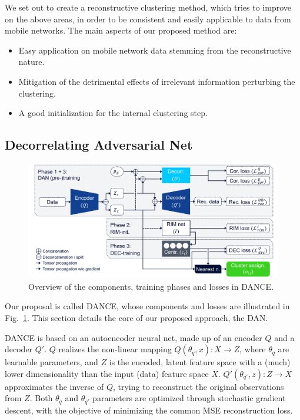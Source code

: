			We set out to create a reconstructive clustering method, which tries to improve on the above areas, in order to be consistent and easily applicable to data from mobile networks.
			The main aspects of our proposed method are:
			\begin{itemize}
				\item Easy application on mobile network data stemming from the reconstructive nature.
				\item Mitigation of the detrimental effects of irrelevant information perturbing the clustering.
				\item A good initialization for the internal clustering step.
			\end{itemize}
			
		\subsection{Decorrelating Adversarial Net}
			
			\begin{figure}[ht]
				\centering
				\includegraphics[width=\linewidth]{figures/07_decorr_ae/dance/dance.pdf}
				\caption[DANCE overview]{Overview of the components, training phases and losses in DANCE.}
				\label{fig:dan_overview}
			\end{figure}
		
			Our proposal is called \ac{DANCE}, whose components and losses are illustrated in Fig.~\ref{fig:dan_overview}.
			This section details the core of our proposed approach, the \ac{DAN}.
			
			\ac{DANCE} is based on an autoencoder neural net, made up of an encoder $Q$ and a decoder $Q'$.
			$Q$ realizes the non-linear mapping $Q(\theta_q, x) : X \rightarrow Z$, where $\theta_q$ are learnable parameters, and $Z$ is the encoded, latent feature space with a (much) lower dimensionality than the input (data) feature space $X$.
			$Q'(\theta_{q'}, z) : Z \rightarrow X$ approximates the inverse of $Q$, trying to reconstruct the original observations from $Z$.
			Both $\theta_q$ and $\theta_{q'}$ parameters are optimized through stochastic gradient descent, with the objective of minimizing the common \ac{MSE} reconstruction loss.
			

